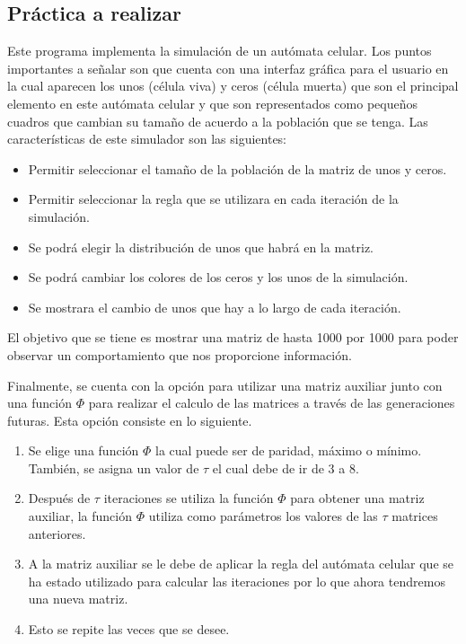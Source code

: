 \documentclass[12pt, titlepage]{article}
\begin{document}
\subsection{Práctica a realizar}
Este programa implementa la simulación de un autómata celular. Los puntos importantes a señalar son que cuenta con una interfaz gráfica para el usuario en la cual aparecen los unos (célula viva) y ceros (célula muerta) que son el principal elemento en este autómata celular y que son representados como pequeños cuadros que cambian su tamaño de acuerdo a la población que se tenga. Las características de este simulador son las siguientes:
\begin{itemize}
 \item Permitir seleccionar el tamaño de la población de la matriz de unos y ceros.
 \item Permitir seleccionar la regla que se utilizara en cada iteración de la simulación.
 \item Se podrá elegir la distribución de unos que habrá en la matriz.
 \item Se podrá cambiar los colores de los ceros y los unos de la simulación.
 \item Se mostrara el cambio de unos que hay a lo largo de cada iteración.
\end{itemize}
El objetivo que se tiene es mostrar una matriz de hasta 1000 por 1000 para poder observar un comportamiento que nos proporcione información.

Finalmente, se cuenta con la opción para utilizar una matriz auxiliar junto con una función $\Phi$ para realizar el calculo de las matrices a través de las generaciones futuras. Esta opción consiste en lo siguiente.

\begin{enumerate}
 \item Se elige una función $\Phi$ la cual puede ser de paridad, máximo o mínimo. También, se asigna un valor de $\tau$ el cual debe de ir de 3 a 8.
 \item Después de $\tau$ iteraciones se utiliza la función $\Phi$ para obtener una matriz auxiliar, la función $\Phi$ utiliza como parámetros los valores de las $\tau$ matrices anteriores.
 \item A la matriz auxiliar se le debe de aplicar la regla del autómata celular que se ha estado utilizado para calcular las iteraciones por lo que ahora tendremos una nueva matriz.
 \item Esto se repite las veces que se desee.
\end{enumerate}
\end{document}
